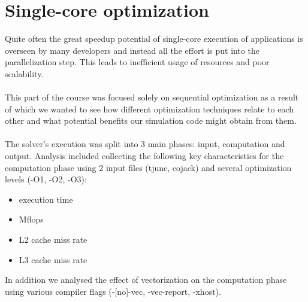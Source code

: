 \documentclass{article}
\begin{document}
\section{Single-core optimization}
Quite often the great speedup potential of single-core execution of applications is overseen by many developers and instead all the effort is put into the parallelization step. This leads to inefficient usage of resources and poor scalability.
\\\\
This part of the course was focused solely on sequential optimization as a result of which we wanted to see how different optimization techniques relate to each other and what potential benefits our simulation code might obtain from them.
\\\\
The solver's execution was split into 3 main phases: input, computation and output. Analysis included collecting the following key characteristics for the computation phase using 2 input files (tjunc, cojack) and several optimization levels (-O1, -O2, -O3):
\begin{itemize}
	\item execution time
	\item Mflops
	\item L2 cache miss rate
	\item L3 cache miss rate
\end{itemize}
In addition we analysed the effect of vectorization on the computation phase using various compiler flags (-[no]-vec, -vec-report, -xhost).
\end{document}

